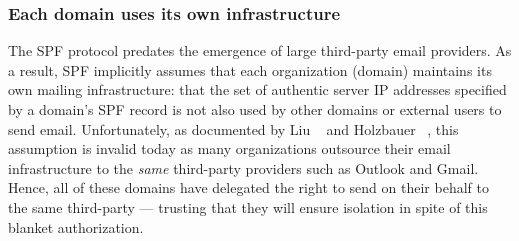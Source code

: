 %
%


\subsubsection{Each domain uses its own infrastructure}
\label{subsubsec:spf_incorporation}
The SPF protocol predates the emergence of large third-party email providers.
As a result, SPF implicitly assumes that each organization (domain) maintains its own mailing infrastructure: that the set of authentic server IP addresses specified by a domain's SPF record is not also used by other domains or external users to send email.
Unfortunately, as documented by Liu \etal~\cite{liu2021s} and Holzbauer \etal~\cite{holzbauer2022not}, this assumption is invalid today as many organizations outsource their email infrastructure to the \emph{same} third-party providers such as Outlook and Gmail.  Hence, all of these domains have delegated the right to send on their behalf to the same third-party --- trusting that they will ensure isolation in spite of this blanket authorization.


